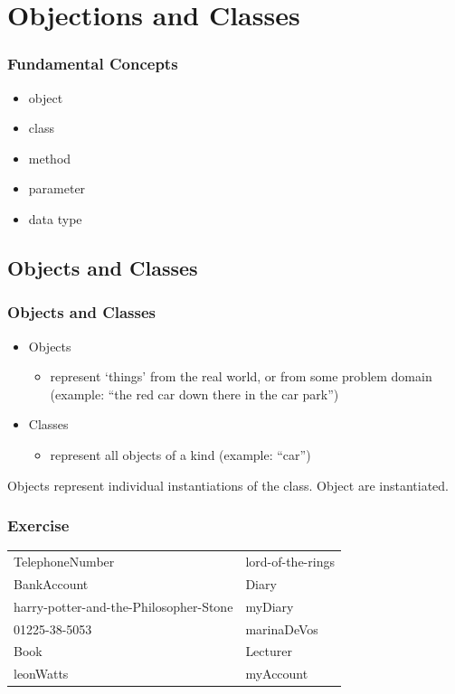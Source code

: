 \section{Objections and Classes}

\begin{frame}
\frametitle{Fundamental Concepts}
\begin{itemize}
\item object
\item class
\item method
\item parameter
\item data type
\end{itemize}
\end{frame}

\subsection{Objects and Classes}

\begin{frame}
\frametitle{Objects and Classes}
\begin{itemize}
\item Objects
\begin{itemize}
\item represent ‘things’ from the real world, or from some problem domain 
(example: “the red car down there in the car park”)‏
\end{itemize}
\item Classes
\begin{itemize}
\item represent all objects of a kind (example: “car”)‏
\end{itemize}
\end{itemize}
\pause
Objects represent individual instantiations of the class. Object are \alert{instantiated}. 
\end{frame}

\begin{frame}
\frametitle{Exercise}
\begin{tabular}{ll}
TelephoneNumber & lord-of-the-rings \\
BankAccount & Diary\\
harry-potter-and-the-Philosopher-Stone  & myDiary\\
01225-38-5053 & marinaDeVos\\
Book & Lecturer\\
leonWatts & myAccount\\
\end{tabular}
\end{frame}

